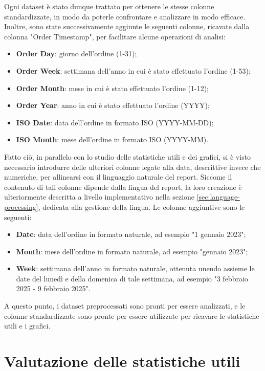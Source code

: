 Ogni dataset è stato dunque trattato per ottenere le stesse colonne standardizzate, in modo da poterle confrontare e analizzare in modo efficace.
Inoltre, sono state successivamente aggiunte le seguenti colonne, ricavate dalla colonna "Order Timestamp", per facilitare alcune operazioni di analisi:
\begin{itemize}
    \item \textbf{Order Day}: giorno dell'ordine (1-31);
    \item \textbf{Order Week}: settimana dell'anno in cui è stato effettuato l'ordine (1-53);
    \item \textbf{Order Month}: mese in cui è stato effettuato l'ordine (1-12);
    \item \textbf{Order Year}: anno in cui è stato effettuato l'ordine (YYYY);
    \item \textbf{ISO Date}: data dell'ordine in formato ISO (YYYY-MM-DD);
    \item \textbf{ISO Month}: mese dell'ordine in formato ISO (YYYY-MM).
\end{itemize}

Fatto ciò, in parallelo con lo studio delle statistiche utili e dei grafici, si è visto necessario introdurre delle ulteriori colonne legate alla data, descrittive invece che numeriche, per allinearsi con il linguaggio naturale del report. Siccome il contenuto di tali colonne dipende dalla lingua del report, la loro creazione è ulteriormente descritta a livello implementativo nella sezione \ref{sec:language-processing}, dedicata alla gestione della lingua. Le colonne aggiuntive sono le seguenti:
\begin{itemize}
    \item \textbf{Date}: data dell'ordine in formato naturale, ad esempio "1 gennaio 2023";
    \item \textbf{Month}: mese dell'ordine in formato naturale, ad esempio "gennaio 2023";
    \item \textbf{Week}: settimana dell'anno in formato naturale, ottenuta unendo assieme le date del lunedì e della domenica di tale settimana, ad esempio "3 febbraio 2025 - 9 febbraio 2025".
\end{itemize}

A questo punto, i dataset preprocessati sono pronti per essere analizzati, e le colonne standardizzate sono pronte per essere utilizzate per ricavare le statistiche utili e i grafici.


\section{Valutazione delle statistiche utili}

